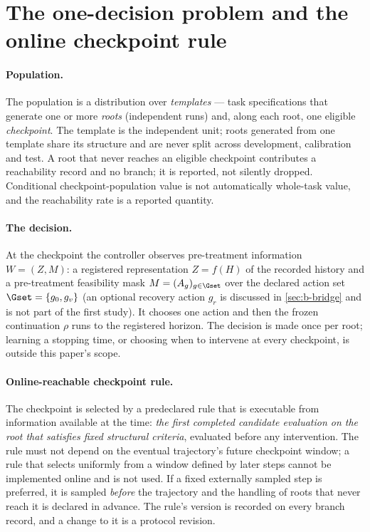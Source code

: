 \section{The one-decision problem and the online checkpoint rule}
\label{sec:b-problem}

\paragraph{Population.}
The population is a distribution over \emph{templates} --- task specifications
that generate one or more \emph{roots} (independent runs) and, along each root,
one eligible \emph{checkpoint}.  The template is the independent unit; roots
generated from one template share its structure and are never split across
development, calibration and test.  A root that never reaches an eligible
checkpoint contributes a reachability record and no branch; it is reported, not
silently dropped.  Conditional checkpoint-population value is not automatically
whole-task value, and the reachability rate is a reported quantity.

\paragraph{The decision.}
At the checkpoint the controller observes pre-treatment information
$W=(Z,M)$: a registered representation $Z=f(H)$ of the recorded history and a
pre-treatment feasibility mask $M=(A_g)_{g\in\Gset}$ over the declared action
set $\Gset=\{g_0,g_v\}$ (an optional recovery action $g_r$ is discussed in
\cref{sec:b-bridge} and is not part of the first study).  It chooses one action
and then the frozen continuation $\rho$ runs to the registered horizon.  The
decision is made once per root; learning a stopping time, or choosing when to
intervene at every checkpoint, is outside this paper's scope.

\paragraph{Online-reachable checkpoint rule.}
The checkpoint is selected by a predeclared rule that is executable from
information available at the time: \emph{the first completed candidate
evaluation on the root that satisfies fixed structural criteria}, evaluated
before any intervention.  The rule must not depend on the eventual trajectory's
future checkpoint window; a rule that selects uniformly from a window defined
by later steps cannot be implemented online and is not used.  If a fixed
externally sampled step is preferred, it is sampled \emph{before} the trajectory
and the handling of roots that never reach it is declared in advance.  The
rule's version is recorded on every branch record, and a change to it is a
protocol revision.

